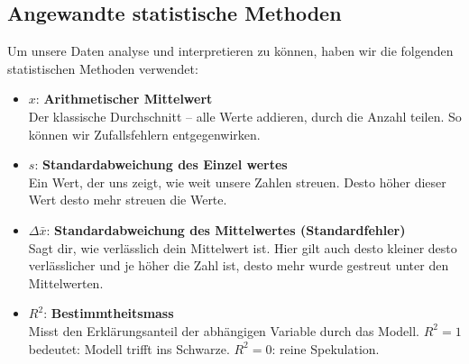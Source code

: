 \documentclass[../main.tex]{subfiles} %
\begin{document}
    \subsection{Angewandte statistische Methoden}\label{subsec:angewandte-statistische-methoden}
        Um unsere Daten analyse und interpretieren zu können, haben wir die folgenden statistischen Methoden verwendet:
        \begin{itemize}
            \item $x$: \textbf{Arithmetischer Mittelwert} \\
            \quad Der klassische Durchschnitt – alle Werte addieren, durch die Anzahl teilen.
                  So können wir Zufallsfehlern entgegenwirken.

            \item $s$: \textbf{Standardabweichung des Einzel    wertes} \\
            \quad Ein Wert, der uns zeigt, wie weit unsere Zahlen streuen.
                  Desto höher dieser Wert desto mehr streuen die Werte.

            \item $\Delta \bar{x}$: \textbf{Standardabweichung des Mittelwertes (Standardfehler)} \\
            \quad Sagt dir, wie verlässlich dein Mittelwert ist.
                  Hier gilt auch desto kleiner desto verlässlicher und je höher die Zahl ist, desto mehr wurde gestreut unter den Mittelwerten.

            \item $R^2$: \textbf{Bestimmtheitsmass} \\
            \quad Misst den Erklärungsanteil der abhängigen Variable durch das Modell. $R^2 = 1$ bedeutet: Modell trifft ins Schwarze. $R^2 = 0$: reine Spekulation.
        \end{itemize}
\end{document}
